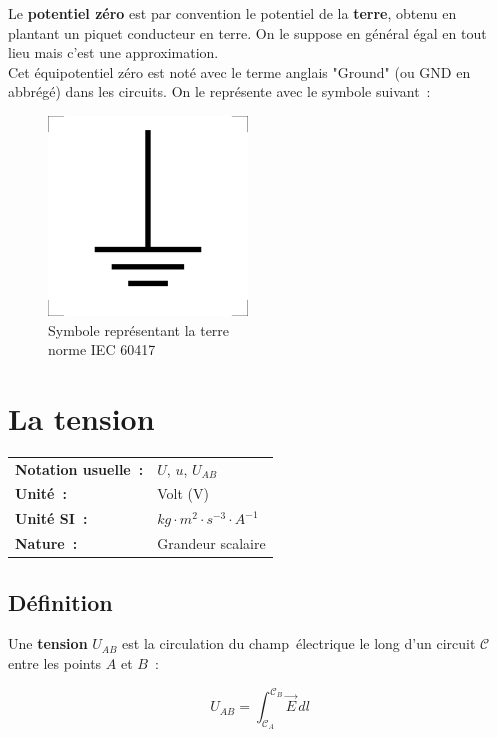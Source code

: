 Le \textbf{potentiel zéro} est par convention le potentiel de la \textbf{terre}, obtenu en plantant un piquet conducteur en terre. On le suppose en général égal en tout lieu mais c'est une approximation. \\

Cet équipotentiel zéro est noté avec le terme anglais "Ground" (ou GND en abbrégé) dans les circuits. On le représente avec le symbole suivant~:

\begin{figure}[!h]
\centering
\includegraphics{part01/chap01/ground.png}
	\caption{Symbole représentant la terre \\ norme IEC 60417 }
\end{figure}


\section{La tension}

\begin{tabular}{ll}
\textbf{Notation usuelle~:} & $U$, $u$, $U_{AB}$ \\
\textbf{Unité~:} & Volt (V) \\
\textbf{Unité SI~:} & ${kg} \cdot m^2 \cdot {s}^{-3} \cdot A^{-1}$ \\
\textbf{Nature~:} & Grandeur scalaire \\
\end{tabular} 

\subsection*{Définition}

Une \textbf{tension} $U_{AB}$ est la circulation du champ électrique le long d'un circuit $\mathscr{C}$ entre les points $A$ et $B$~:

\begin{equation}
	U_{AB} = \int_{\mathscr{C}_{A}}^{\mathscr{C}_B}\vec{E}\,dl
\end{equation}

